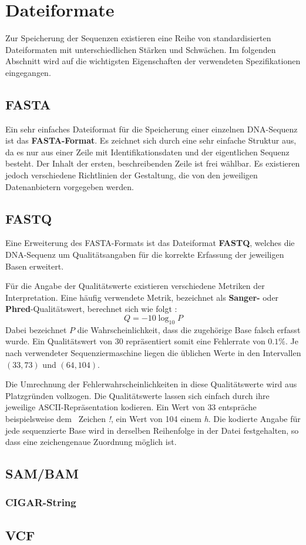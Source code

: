 \chapter{Dateiformate}
\label{sec:data}
Zur Speicherung der Sequenzen existieren eine Reihe von standardisierten Dateiformaten mit unterschiedlichen Stärken und Schwächen. Im folgenden Abschnitt wird auf die wichtigsten Eigenschaften der verwendeten Spezifikationen eingegangen.
\section{FASTA}
\label{sec:data:fasta}
Ein sehr einfaches Dateiformat für die Speicherung einer einzelnen DNA-Sequenz ist das \textbf{FASTA-Format}. Es zeichnet sich durch eine sehr einfache Struktur aus, da es nur aus einer Zeile mit Identifikationsdaten und der eigentlichen Sequenz besteht. Der Inhalt der ersten, beschreibenden Zeile ist frei wählbar. Es existieren jedoch verschiedene Richtlinien der Gestaltung, die von den jeweiligen Datenanbietern vorgegeben werden.
\section{FASTQ}
\label{sec:data:fastq}
Eine Erweiterung des FASTA-Formats ist das Dateiformat \textbf{FASTQ}, welches die DNA-Sequenz um Qualitätsangaben für die korrekte Erfassung der jeweiligen Basen erweitert. 

Für die Angabe der Qualitätswerte existieren verschiedene Metriken der Interpretation. Eine häufig verwendete Metrik, bezeichnet als \textbf{Sanger-} oder \textbf{Phred}-Qualitätswert, berechnet sich wie folgt \citep{Ewing1998}:
\begin{equation}
	Q = -10 \log_{10} P
\end{equation}
Dabei bezeichnet $P$ die Wahrscheinlichkeit, dass die zugehörige Base falsch erfasst wurde. Ein Qualitätswert von $30$ repräsentiert somit eine Fehlerrate von $0.1 \%$. Je nach verwendeter Sequenziermaschine liegen die üblichen Werte in den Intervallen $(33, 73)$ und $(64, 104)$. %

Die Umrechnung der Fehlerwahrscheinlichkeiten in diese Qualitätswerte wird aus Platzgründen vollzogen. Die Qualitätswerte lassen sich einfach durch ihre jeweilige ASCII-Repräsentation kodieren. Ein Wert von $33$ entspräche beispielsweise dem ~Zeichen \textit{!}, ein Wert von 104 einem \textit{h}. Die kodierte Angabe für jede sequenzierte Base wird in derselben Reihenfolge in der Datei festgehalten, so dass eine zeichengenaue Zuordnung möglich ist.
\section{SAM/BAM}
\label{sec:data:sambam}

\subsection{CIGAR-String}
\label{sec:data:cigar}

\section{VCF}
\label{sec:data:vcf}
